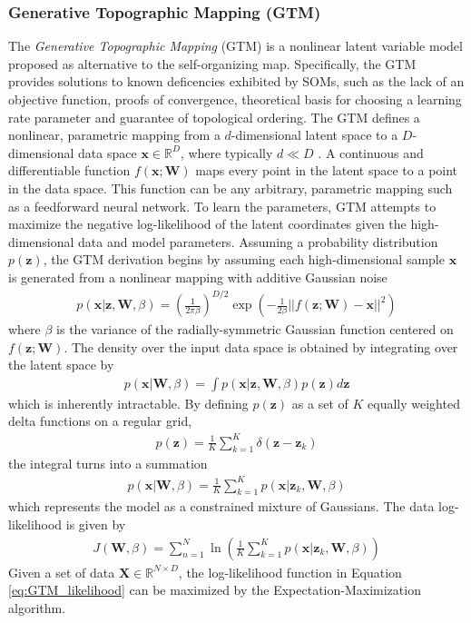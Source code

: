 \subsubsection{Generative Topographic Mapping (GTM)} \label{sec:GTM}
The \textit{Generative Topographic Mapping} (GTM) \citep{Bishop1998GTM} is a nonlinear latent variable model proposed as alternative to the self-organizing map.  Specifically, the GTM provides solutions to known deficencies exhibited by SOMs, such as the lack of an objective function, proofs of convergence, theoretical basis for choosing a learning rate parameter and guarantee of topological ordering.  The GTM defines a nonlinear, parametric mapping from a $d$-dimensional latent space to a $D$-dimensional data space $\bm{x} \in \mathbb{R}^{D}$, where typically $d \ll D$ \citep{Pena2007NeuralGasReview}.  A continuous and differentiable function $f(\bm{x;\bm{W}})$ maps every point in the latent space to a point in the data space.  This function can be any arbitrary, parametric mapping such as a feedforward neural network.  To learn the parameters, GTM attempts to maximize the negative log-likelihood of the latent coordinates given the high-dimensional data and model parameters.  Assuming a probability distribution $p(\bm{z})$, the GTM derivation begins by assuming each high-dimensional sample $\bm{x}$ is generated from a nonlinear mapping with additive Gaussian noise
\begin{align}
	p(\bm{x}|\bm{z},\bm{W},\beta) = \left ( \frac{1}{2 \pi \beta} \right )^{D/2} \exp{\left ( -\frac{1}{2 \beta} ||f(\bm{z};\bm{W}) - \bm{x} ||^{2} \right )}
\end{align}
\noindent
where $\beta$ is the variance of the radially-symmetric Gaussian function centered on $f(\bm{z};\bm{W})$.  The density over the input data space is obtained by integrating over the latent space by
\begin{align}
		p(\bm{x}|\bm{W},\beta) = \int p(\bm{x}|\bm{z},\bm{W},\beta) p(\bm{z}) d \bm{z}
\end{align}
\noindent
which is inherently intractable.  By defining $p(\bm{z})$ as a set of $K$ equally weighted delta functions on a regular grid, 
\begin{align}
	p(\bm{z}) = \frac{1}{K} \sum_{k=1}^{K} \delta (\bm{z} - \bm{z}_{k})
\end{align}
\noindent
the integral turns into a summation
\begin{align}
		p(\bm{x}|\bm{W},\beta) = \frac{1}{K} \sum_{k=1}^{K} p(\bm{x} | \bm{z}_{k}, \bm{W}, \beta)
\end{align}
which represents the model as a constrained mixture of Gaussians.  The data log-likelihood is given by
\begin{align} \label{eq:GTM_likelihood}
	J(\bm{W}, \beta) = \sum_{n=1}^{N} \ln \left( \frac{1}{K} \sum_{k=1}^{K} p(\bm{x} | \bm{z}_{k}, \bm{W}, \beta) \right)
\end{align}
\noindent
Given a set of data $\bm{X} \in \mathbb{R}^{N \times D}$, the log-likelihood function in Equation \ref{eq:GTM_likelihood} can be maximized by the Expectation-Maximization algorithm.

